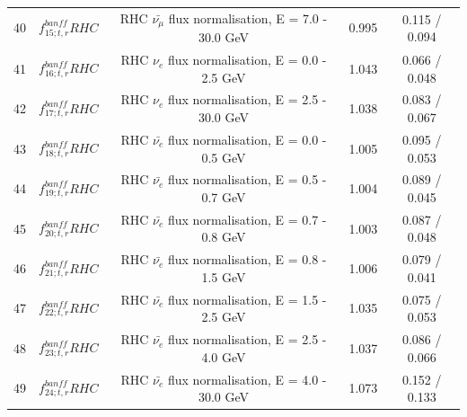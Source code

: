 \begin{tabular} { | c | c | c | c | c |  }
40 & $f_{15; t, r}^{banff} RHC$ & RHC $\bar{\nu_\mu}$ flux normalisation, E = 7.0 - 30.0 GeV & 0.995 & 0.115 / 0.094\\ 
41 & $f_{16; t, r}^{banff} RHC$ & RHC $\nu_e$ flux normalisation, E = 0.0 - 2.5 GeV & 1.043 & 0.066 / 0.048\\ 
42 & $f_{17; t, r}^{banff} RHC$ & RHC $\nu_e$ flux normalisation, E = 2.5 - 30.0 GeV & 1.038 & 0.083 / 0.067\\ 
43 & $f_{18; t, r}^{banff} RHC$ & RHC $\bar{\nu_e}$ flux normalisation, E = 0.0 - 0.5 GeV & 1.005 & 0.095 / 0.053\\ 
44 & $f_{19; t, r}^{banff} RHC$ & RHC $\bar{\nu_e}$ flux normalisation, E = 0.5 - 0.7 GeV & 1.004 & 0.089 / 0.045\\ 
45 & $f_{20; t, r}^{banff} RHC$ & RHC $\bar{\nu_e}$ flux normalisation, E = 0.7 - 0.8 GeV & 1.003 & 0.087 / 0.048\\ 
46 & $f_{21; t, r}^{banff} RHC$ & RHC $\bar{\nu_e}$ flux normalisation, E = 0.8 - 1.5 GeV & 1.006 & 0.079 / 0.041\\ 
47 & $f_{22; t, r}^{banff} RHC$ & RHC $\bar{\nu_e}$ flux normalisation, E = 1.5 - 2.5 GeV & 1.035 & 0.075 / 0.053\\ 
48 & $f_{23; t, r}^{banff} RHC$ & RHC $\bar{\nu_e}$ flux normalisation, E = 2.5 - 4.0 GeV & 1.037 & 0.086 / 0.066\\ 
49 & $f_{24; t, r}^{banff} RHC$ & RHC $\bar{\nu_e}$ flux normalisation, E = 4.0 - 30.0 GeV & 1.073 & 0.152 / 0.133\\ 
\hline

\end{tabular}